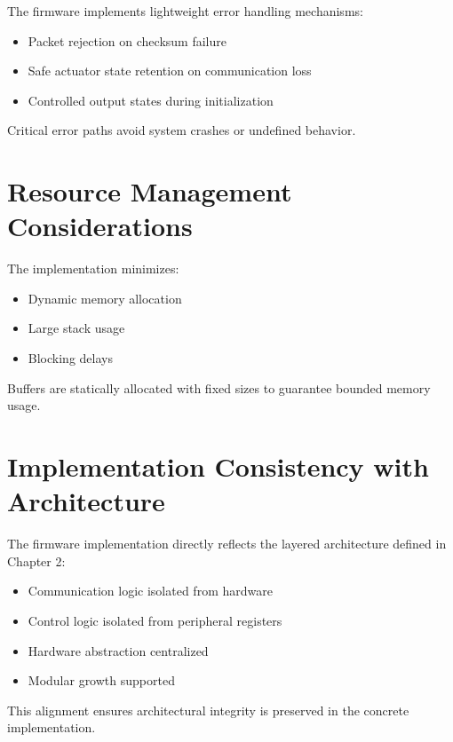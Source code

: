 The firmware implements lightweight error handling mechanisms:

\begin{itemize}
	\item Packet rejection on checksum failure
	\item Safe actuator state retention on communication loss
	\item Controlled output states during initialization
\end{itemize}

Critical error paths avoid system crashes or undefined behavior.


\section{Resource Management Considerations}

The implementation minimizes:

\begin{itemize}
	\item Dynamic memory allocation
	\item Large stack usage
	\item Blocking delays
\end{itemize}

Buffers are statically allocated with fixed sizes to guarantee bounded memory usage.


\section{Implementation Consistency with Architecture}

The firmware implementation directly reflects the layered architecture defined in Chapter 2:

\begin{itemize}
	\item Communication logic isolated from hardware
	\item Control logic isolated from peripheral registers
	\item Hardware abstraction centralized
	\item Modular growth supported
\end{itemize}

This alignment ensures architectural integrity is preserved in the concrete implementation.

